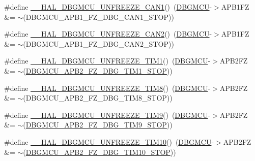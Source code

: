 \begin{DoxyCompactItemize}
\item 
\#define \hyperlink{group___h_a_l___exported___macros_gad580d0ec1c7b8eb8d5935e1fcbd58b07}{\+\_\+\+\_\+\+H\+A\+L\+\_\+\+D\+B\+G\+M\+C\+U\+\_\+\+U\+N\+F\+R\+E\+E\+Z\+E\+\_\+\+C\+A\+N1}()~(\hyperlink{group___peripheral__declaration_ga92ec6d9ec2251fda7d4ce09748cd74b4}{D\+B\+G\+M\+CU}-\/$>$A\+P\+B1\+FZ \&= $\sim$(D\+B\+G\+M\+C\+U\+\_\+\+A\+P\+B1\+\_\+\+F\+Z\+\_\+\+D\+B\+G\+\_\+\+C\+A\+N1\+\_\+\+S\+T\+OP))
\item 
\#define \hyperlink{group___h_a_l___exported___macros_ga10fd523f4709571f091465b8d58ad385}{\+\_\+\+\_\+\+H\+A\+L\+\_\+\+D\+B\+G\+M\+C\+U\+\_\+\+U\+N\+F\+R\+E\+E\+Z\+E\+\_\+\+C\+A\+N2}()~(\hyperlink{group___peripheral__declaration_ga92ec6d9ec2251fda7d4ce09748cd74b4}{D\+B\+G\+M\+CU}-\/$>$A\+P\+B1\+FZ \&= $\sim$(D\+B\+G\+M\+C\+U\+\_\+\+A\+P\+B1\+\_\+\+F\+Z\+\_\+\+D\+B\+G\+\_\+\+C\+A\+N2\+\_\+\+S\+T\+OP))
\item 
\#define \hyperlink{group___h_a_l___exported___macros_ga2f91eec9f9a424ab611be0e770c6692e}{\+\_\+\+\_\+\+H\+A\+L\+\_\+\+D\+B\+G\+M\+C\+U\+\_\+\+U\+N\+F\+R\+E\+E\+Z\+E\+\_\+\+T\+I\+M1}()~(\hyperlink{group___peripheral__declaration_ga92ec6d9ec2251fda7d4ce09748cd74b4}{D\+B\+G\+M\+CU}-\/$>$A\+P\+B2\+FZ \&= $\sim$(\hyperlink{group___peripheral___registers___bits___definition_ga3eb7be194b6ffb258b9e9f5ed08a931e}{D\+B\+G\+M\+C\+U\+\_\+\+A\+P\+B2\+\_\+\+F\+Z\+\_\+\+D\+B\+G\+\_\+\+T\+I\+M1\+\_\+\+S\+T\+OP}))
\item 
\#define \hyperlink{group___h_a_l___exported___macros_ga7375cef18047e43c68f6bd871de40f1a}{\+\_\+\+\_\+\+H\+A\+L\+\_\+\+D\+B\+G\+M\+C\+U\+\_\+\+U\+N\+F\+R\+E\+E\+Z\+E\+\_\+\+T\+I\+M8}()~(\hyperlink{group___peripheral__declaration_ga92ec6d9ec2251fda7d4ce09748cd74b4}{D\+B\+G\+M\+CU}-\/$>$A\+P\+B2\+FZ \&= $\sim$(D\+B\+G\+M\+C\+U\+\_\+\+A\+P\+B2\+\_\+\+F\+Z\+\_\+\+D\+B\+G\+\_\+\+T\+I\+M8\+\_\+\+S\+T\+OP))
\item 
\#define \hyperlink{group___h_a_l___exported___macros_ga3c336afea7d87b769cee4fb059ed2477}{\+\_\+\+\_\+\+H\+A\+L\+\_\+\+D\+B\+G\+M\+C\+U\+\_\+\+U\+N\+F\+R\+E\+E\+Z\+E\+\_\+\+T\+I\+M9}()~(\hyperlink{group___peripheral__declaration_ga92ec6d9ec2251fda7d4ce09748cd74b4}{D\+B\+G\+M\+CU}-\/$>$A\+P\+B2\+FZ \&= $\sim$(\hyperlink{group___peripheral___registers___bits___definition_gaf12c17533a1e3262ee11f760e44f5127}{D\+B\+G\+M\+C\+U\+\_\+\+A\+P\+B2\+\_\+\+F\+Z\+\_\+\+D\+B\+G\+\_\+\+T\+I\+M9\+\_\+\+S\+T\+OP}))
\item 
\#define \hyperlink{group___h_a_l___exported___macros_gaa63c03a742fa4728b49077514189b318}{\+\_\+\+\_\+\+H\+A\+L\+\_\+\+D\+B\+G\+M\+C\+U\+\_\+\+U\+N\+F\+R\+E\+E\+Z\+E\+\_\+\+T\+I\+M10}()~(\hyperlink{group___peripheral__declaration_ga92ec6d9ec2251fda7d4ce09748cd74b4}{D\+B\+G\+M\+CU}-\/$>$A\+P\+B2\+FZ \&= $\sim$(\hyperlink{group___peripheral___registers___bits___definition_ga24d4bbf803a65e8202b0019ed0ce0ebb}{D\+B\+G\+M\+C\+U\+\_\+\+A\+P\+B2\+\_\+\+F\+Z\+\_\+\+D\+B\+G\+\_\+\+T\+I\+M10\+\_\+\+S\+T\+OP}))

\end{DoxyCompactItemize}
